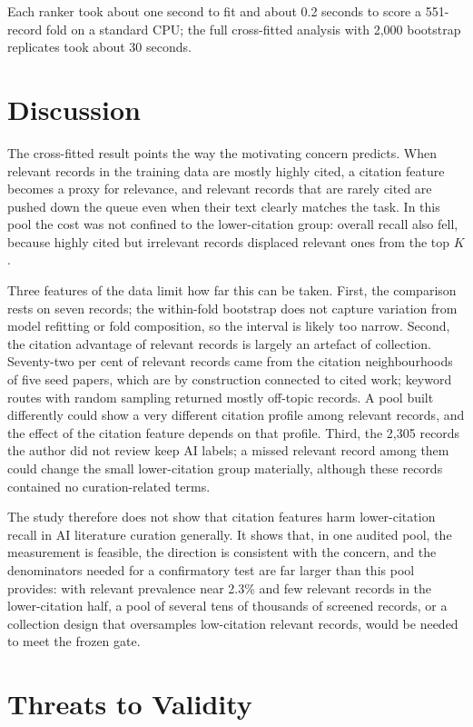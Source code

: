 \documentclass[acmsmall,screen,nonacm]{acmart}
\begin{document}
Each ranker took about one second to fit and about 0.2 seconds to score a 551-record fold on a standard
CPU; the full cross-fitted analysis with 2,000 bootstrap replicates took about 30 seconds.

\section{Discussion}
\label{sec:discussion}

The cross-fitted result points the way the motivating concern predicts. When relevant records in the
training data are mostly highly cited, a citation feature becomes a proxy for relevance, and relevant
records that are rarely cited are pushed down the queue even when their text clearly matches the task. In
this pool the cost was not confined to the lower-citation group: overall recall also fell, because highly
cited but irrelevant records displaced relevant ones from the top $K$.

Three features of the data limit how far this can be taken. First, the comparison rests on seven records;
the within-fold bootstrap does not capture variation from model refitting or fold composition, so the
interval is likely too narrow. Second, the citation advantage of relevant records is largely an
artefact of collection. Seventy-two per cent of relevant records came from the citation neighbourhoods of
five seed papers, which are by construction connected to cited work; keyword routes with random sampling
returned mostly off-topic records. A pool built differently could show a very different citation profile
among relevant records, and the effect of the citation feature depends on that profile. Third, the 2,305 records the author did not review keep AI labels; a missed relevant record
among them could change the small lower-citation group materially, although these records contained no
curation-related terms.

The study therefore does not show that citation features harm lower-citation recall in AI literature
curation generally. It shows that, in one audited pool, the measurement is feasible, the direction is
consistent with the concern, and the denominators needed for a confirmatory test are far larger than this
pool provides: with relevant prevalence near 2.3\% and few relevant records in the lower-citation half, a
pool of several tens of thousands of screened records, or a collection design that oversamples
low-citation relevant records, would be needed to meet the frozen gate.

\section{Threats to Validity}
\label{sec:threats}
\end{document}
